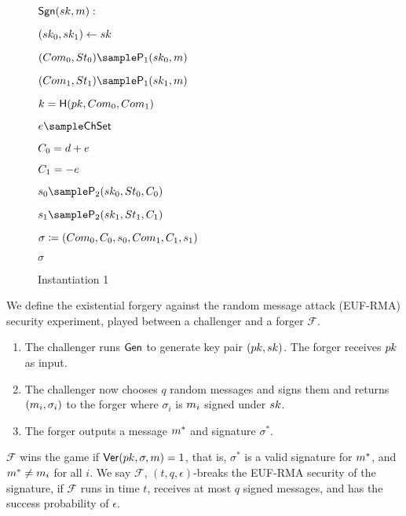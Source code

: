 \begin{definition}
\begin{center}
\begin{figure}[htb!]
{\begin{minipage}[t]{0.5\textwidth}
                       
        \end{minipage}
        \begin{minipage}[t]{0.5\textwidth}
            \underline{$\mathsf{Sgn}(sk,m):$}
            \begin{nicodemus}
            	\item $(sk_0,sk_1) \leftarrow sk$
            	\item	$(\com_0,\st_0)\sample\IDP_1(\sk_0,\m)$
		\item $(\com_1,\st_1)\sample\IDP_1(\sk_1,\m)$ 
		\item $ k = \mathsf{H}(pk,Com_0,Com_1) $
  		\item $ e \sample \ChSet$
		\item $ C_0 = d+e $
		\item $C_1 = -e$  
		\item $\s_0 \sample\IDP_2(\sk_0,\st_0,\c_0)$
		\item $ \s_1 \sample\IDP_2(\sk_1,\st_1,\c_1)$
		\item $\sigma \coloneqq (Com_0,C_0,s_0, Com_1, C_1,s_1)$
		\item \pcreturn $\sigma$
            \end{nicodemus}

        \end{minipage}

    }
    \caption{Instantiation 1}
    \label{fig:prf-security}
\end{figure}
\end{center}
\end{definition}

\begin{definition}
We define the existential forgery against the random message attack (EUF-RMA) security experiment, played between a challenger and a forger $\mathcal{F}$.
\begin{enumerate}
\item The challenger runs $\mathsf{Gen}$ to generate key pair $(pk,sk)$. 
The forger receives $pk$ as input.
\item The challenger now chooses $q$ random messages and signs them and returns $(m_i,\sigma_i)$ to the forger where $\sigma_i$ is $m_i$ signed under $sk$.
\item The forger outputs a message $m^*$ and signature $\sigma^*$.
\end{enumerate}
$\mathcal{F}$ wins the game if $\mathsf{Ver}(pk,\sigma,m) = 1$, that is, $\sigma^*$ is a valid signature for $m^*$, and $m^* \neq m_i$ for all $i$. We say $\mathcal{F}$, $(t,q,\epsilon)$-breaks the EUF-RMA security of the signature, if $\mathcal{F}$ runs in time $t$, receives at most $q$ signed messages, and has the success probability of $\epsilon$. 
\end{definition}



